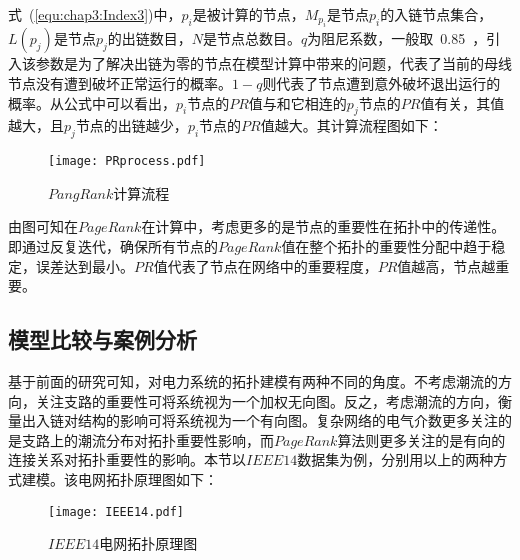 式~(\ref{equ:chap3:Index3})中，$p_i$是被计算的节点，$M_{p_i}$是节点$p_i$的入链节点集合，$L(p_j)$是节点$p_j$的出链数目，$N$是节点总数目。$q$为阻尼系数，一般取~0.85~，引入该参数是为了解决出链为零的节点在模型计算中带来的问题，代表了当前的母线节点没有遭到破坏正常运行的概率。$1-q$则代表了节点遭到意外破坏退出运行的概率。从公式中可以看出，$p_i$节点的$PR$值与和它相连的$p_j$节点的$PR$值有关，其值越大，且$p_j$节点的出链越少，$p_i$节点的$PR$值越大。其计算流程图如下：
\begin{figure}[H] %
  \centering
  \texttt{[image: PRprocess.pdf]}
  \caption{$PangRank$计算流程}
  \label{fig:PRPro}
\end{figure}

由图可知在$PageRank$在计算中，考虑更多的是节点的重要性在拓扑中的传递性。即通过反复迭代，确保所有节点的$PageRank$值在整个拓扑的重要性分配中趋于稳定，误差达到最小。$PR$值代表了节点在网络中的重要程度，$PR$值越高，节点越重要。

\subsection{模型比较与案例分析}
基于前面的研究可知，对电力系统的拓扑建模有两种不同的角度。不考虑潮流的方向，关注支路的重要性可将系统视为一个加权无向图。反之，考虑潮流的方向，衡量出入链对结构的影响可将系统视为一个有向图。复杂网络的电气介数更多关注的是支路上的潮流分布对拓扑重要性影响，而$PageRank$算法则更多关注的是有向的连接关系对拓扑重要性的影响。本节以$IEEE14$数据集为例，分别用以上的两种方式建模。该电网拓扑原理图如下：
\begin{figure}[H] %
  \centering
  \texttt{[image: IEEE14.pdf]}
  \caption{$IEEE14$电网拓扑原理图}
  \label{fig:fundement14}
\end{figure}

